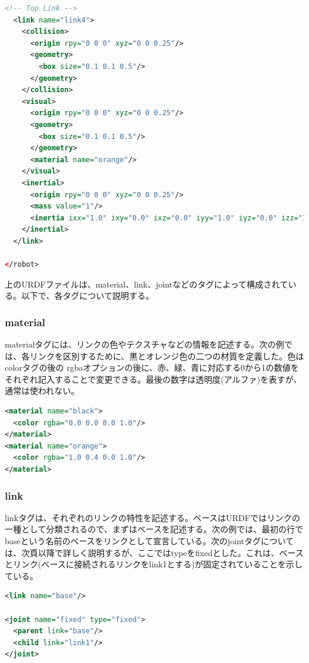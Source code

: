 \begin{lstlisting}[language=XML]
  <!-- Top Link -->
  <link name="link4">
    <collision>
      <origin rpy="0 0 0" xyz="0 0 0.25"/>
      <geometry>
        <box size="0.1 0.1 0.5"/>
      </geometry>
    </collision>
    <visual>
      <origin rpy="0 0 0" xyz="0 0 0.25"/>
      <geometry>
        <box size="0.1 0.1 0.5"/>
      </geometry>
      <material name="orange"/>
    </visual>
    <inertial>
      <origin rpy="0 0 0" xyz="0 0 0.25"/>
      <mass value="1"/>
      <inertia ixx="1.0" ixy="0.0" ixz="0.0" iyy="1.0" iyz="0.0" izz="1.0"/>
    </inertial>
  </link>

</robot>
\end{lstlisting}

上のURDFファイルは、material、link、jointなどのタグによって構成されている。以下で、各タグについて説明する。

\subsubsection{material}
materialタグには、リンクの色やテクスチャなどの情報を記述する。次の例では、各リンクを区別するために、黒とオレンジ色の二つの材質を定義した。色はcolorタグの後の rgbaオプションの後に、赤、緑、青に対応する0から1の数値をそれぞれ記入することで変更できる。最後の数字は透明度(アルファ)を表すが、通常は使われない。

\begin{lstlisting}[language=XML]
<material name="black">
  <color rgba="0.0 0.0 0.0 1.0"/>
</material>
<material name="orange">
  <color rgba="1.0 0.4 0.0 1.0"/>
</material>
\end{lstlisting}

\subsubsection{link}

linkタグは、それぞれのリンクの特性を記述する。ベースはURDFではリンクの一種として分類されるので、まずはベースを記述する。次の例では、最初の行でbaseという名前のベースをリンクとして宣言している。次のjointタグについては、次頁以降で詳しく説明するが、ここではtypeをfixedとした。これは、ベースとリンク(ベースに接続されるリンクをlink1とする)が固定されていることを示している。

\begin{lstlisting}[language=XML]
<link name="base"/>

<joint name="fixed" type="fixed">
  <parent link="base"/>
  <child link="link1"/>
</joint>
\end{lstlisting}


